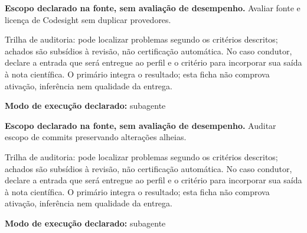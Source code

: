 
\begin{descricao}
\textbf{Escopo declarado na fonte, sem avaliação de desempenho.}
Avaliar fonte e licença de Codesight sem duplicar provedores.
\end{descricao}

\begin{funcao}
Trilha de auditoria: pode localizar problemas segundo os critérios descritos; achados são subsídios à revisão, não certificação automática. No caso condutor, declare a entrada que será entregue ao perfil e o critério para incorporar sua saída à nota científica. O primário integra o resultado; esta ficha não comprova ativação, inferência nem qualidade da entrega.
\end{funcao}

\begin{arquitetura}
\textbf{Modo de execução declarado:} subagente
\end{arquitetura}


\begin{descricao}
\textbf{Escopo declarado na fonte, sem avaliação de desempenho.}
Auditar escopo de commits preservando alterações alheias.
\end{descricao}

\begin{funcao}
Trilha de auditoria: pode localizar problemas segundo os critérios descritos; achados são subsídios à revisão, não certificação automática. No caso condutor, declare a entrada que será entregue ao perfil e o critério para incorporar sua saída à nota científica. O primário integra o resultado; esta ficha não comprova ativação, inferência nem qualidade da entrega.
\end{funcao}

\begin{arquitetura}
\textbf{Modo de execução declarado:} subagente
\end{arquitetura}



